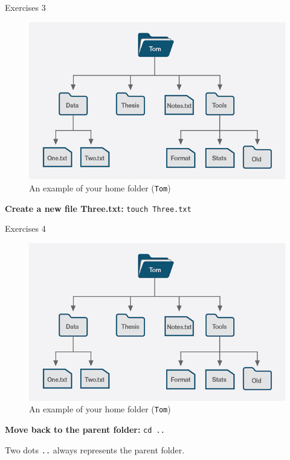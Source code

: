 \documentclass{beamer}
\begin{document}
\begin{frame}{Exercises 3}
	\begin{figure}
		\centering
		\includegraphics[width=0.7\linewidth]{00shell}
		\caption{An example of your home folder (\texttt{Tom})}
		\label{fig:00shell}
	\end{figure}
	\textbf{Create a new file Three.txt:} \pause \texttt{touch Three.txt}
\end{frame}

\begin{frame}{Exercises 4}
	\begin{figure}
		\centering
		\includegraphics[width=0.7\linewidth]{00shell}
		\caption{An example of your home folder (\texttt{Tom})}
		\label{fig:00shell}
	\end{figure}
	\textbf{Move back to the parent folder:} \pause \texttt{cd ..}
	
	Two dots \texttt{..} always represents the parent folder.
\end{frame}
\end{document}
